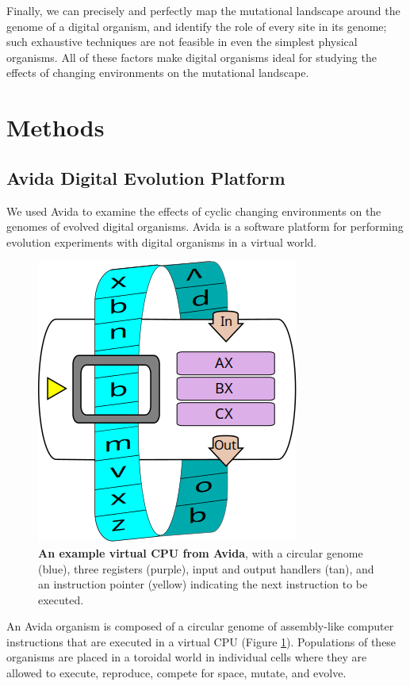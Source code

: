 \documentclass[letterpaper]{article}
\begin{document}
Finally, we can precisely and perfectly map the mutational landscape around the genome of a digital organism, and identify the role of every site in its genome\citep{ofria_evolution_2002}; such exhaustive techniques are not feasible in even the simplest physical organisms.  All of these factors make digital organisms ideal for studying the effects of changing environments on the mutational landscape.

\section{Methods}

\subsection{Avida Digital Evolution Platform}
We used Avida \citep{lenski_evolutionary_2003} to examine the effects of cyclic changing environments on the genomes of evolved digital organisms. Avida is a software platform for performing evolution experiments with digital organisms in a virtual world.

\begin{figure}[h!]
\begin{center}
\includegraphics[width=0.5\columnwidth]{figures/squishedCPU_extra.png}
\caption{\textbf{An example virtual CPU from Avida}, with a circular genome (blue), three registers (purple), input and output handlers (tan), and an instruction pointer (yellow) indicating the next instruction to be executed.%
}\label{fig:cpu}
\end{center}
\end{figure}

An Avida organism is composed of a circular genome of assembly-like computer instructions that are executed in a virtual CPU (Figure \ref{fig:cpu}). Populations of these organisms are placed in a toroidal world in individual cells where they are allowed to execute, reproduce, compete for space, mutate, and evolve.
\end{document}
